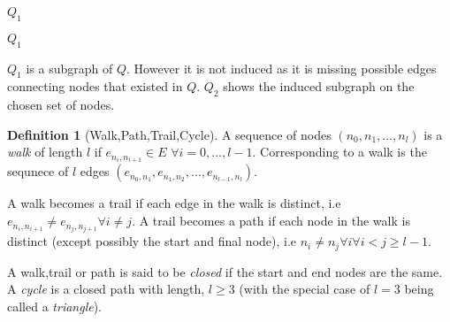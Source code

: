 \documentclass[a4paper,10pt]{article}
\theoremstyle{definition}
\newtheorem{definition}[theorem]{Definition}
\theoremstyle{definition}
\theoremstyle{remark}
\theoremstyle{definition}
\begin{document}
\begin{myfigure}
\begin{center}
\begin{submyfigure}{.3\textwidth}
\begin{center}
\begin{tikzpicture}
\end{tikzpicture}
\end{center}
\caption{$Q_{1}$}
\label{subexamplefigure: subgraph}
\end{submyfigure}
\begin{submyfigure}{.3\textwidth}
\begin{center}
\end{center}
\caption{$Q_{1}$}
\label{subexamplefigure: induced subgraph}
\end{submyfigure}
\caption{ $Q_{1}$ is a subgraph of $Q$. However it is not induced as it is missing possible edges connecting nodes that existed in $Q$. $Q_{2}$ shows the induced subgraph on the chosen set of nodes. }
\end{center}
\label{examplefigure: subgraph example}
\end{myfigure}

\begin{definition}[Walk,Path,Trail,Cycle]
A sequence of nodes $(n_{0},n_{1},...,n_{l})$ is a \textit{walk} of length $l$ if $e_{n_{i},n_{i+1}} \in E$ $\forall i=0,...,l-1$. Corresponding to a walk is the sequnece of $l$ edges $(e_{n_{0},n_{1}},e_{n_{1},n_{2}},...,e_{n_{l-1},n_{l}})$.

A walk becomes a trail if each edge in the walk is distinct, i.e $e_{n_{i},n_{i+1}} \neq e_{n_{j},n_{j+1}} \forall i \neq j$. A trail becomes a path if each node in the walk is distinct (except possibly the start and final node), i.e $n_{i} \neq n_{j} \forall i \forall i < j \geq l-1$.

A walk,trail or path is said to be \textit{closed} if the start and end nodes are the same. A \textit{cycle} is a closed path with length, $l \geq 3$ (with the special case of $l=3$ being called a \textit{triangle}).
\end{definition}
\end{document}
